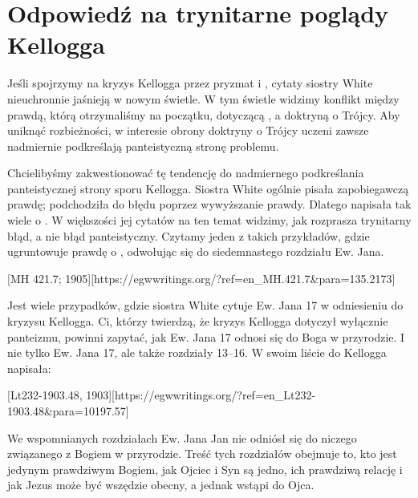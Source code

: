 \chapter{Odpowiedź na trynitarne poglądy Kellogga}

Jeśli spojrzymy na kryzys Kellogga przez pryzmat  i , cytaty siostry White nieuchronnie jaśnieją w nowym świetle. W tym świetle widzimy konflikt między prawdą, którą otrzymaliśmy na początku, dotyczącą , a doktryną o Trójcy. Aby uniknąć rozbieżności, w interesie obrony doktryny o Trójcy uczeni zawsze nadmiernie podkreślają panteistyczną stronę problemu.

Chcielibyśmy zakwestionować tę tendencję do nadmiernego podkreślania panteistycznej strony sporu Kellogga. Siostra White ogólnie pisała zapobiegawczą prawdę; podchodziła do błędu poprzez wywyższanie prawdy. Dlatego napisała tak wiele o . W większości jej cytatów na ten temat widzimy, jak rozprasza trynitarny błąd, a nie błąd panteistyczny. Czytamy jeden z takich przykładów, gdzie ugruntowuje prawdę o , odwołując się do siedemnastego rozdziału Ew. Jana.

[MH 421.7; 1905][https://egwwritings.org/?ref=en\_MH.421.7&para=135.2173]

Jest wiele przypadków, gdzie siostra White cytuje Ew. Jana 17 w odniesieniu do kryzysu Kellogga. Ci, którzy twierdzą, że kryzys Kellogga dotyczył wyłącznie panteizmu, powinni zapytać, jak Ew. Jana 17 odnosi się do Boga w przyrodzie. I nie tylko Ew. Jana 17, ale także rozdziały 13--16. W swoim liście do Kellogga napisała:

[Lt232-1903.48, 1903][https://egwwritings.org/?ref=en\_Lt232-1903.48&para=10197.57]

We wspomnianych rozdziałach Ew. Jana Jan nie odniósł się do niczego związanego z Bogiem w przyrodzie. Treść tych rozdziałów obejmuje to, kto jest jedynym prawdziwym Bogiem, jak Ojciec i Syn są jedno, ich prawdziwą relację i jak Jezus może być wszędzie obecny, a jednak wstąpi do Ojca.

